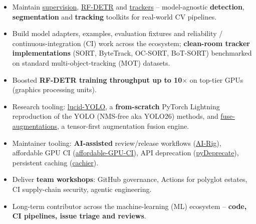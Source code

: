 \documentclass[10pt,a4paper,sans]{moderncv}
\begin{document}
{
	\begin{itemize}
		\item Maintain \href{https://github.com/roboflow/supervision}{supervision}, \href{https://github.com/roboflow/RF-DETR}{RF-DETR} and \href{https://github.com/roboflow/trackers}{trackers} -- model-agnostic \textbf{detection}, \textbf{segmentation} and \textbf{tracking} toolkits for real-world CV pipelines.
		\item Build model adapters, examples, evaluation fixtures and reliability / continuous-integration (CI) work across the ecosystem; \textbf{clean-room tracker implementations} (SORT, ByteTrack, OC-SORT, BoT-SORT) benchmarked on standard multi-object-tracking (MOT) datasets.
		\item Boosted \textbf{RF-DETR training throughput up to 10$\times$} on top-tier GPUs (graphics processing units).
	\end{itemize}
}
{
	\begin{itemize}
		\item Research tooling: \href{https://github.com/Borda/lucid-YOLO}{lucid-YOLO}, a \textbf{from-scratch} PyTorch Lightning reproduction of the YOLO (NMS-free aka YOLO26) methods, and \href{https://github.com/Borda/fuse-augmentations}{fuse-augmentations}, a tensor-first augmentation fusion engine.
		\item Maintainer tooling: \textbf{AI-assisted} review/release workflows (\href{https://github.com/Borda/AI-Rig}{AI-Rig}), affordable GPU CI (\href{https://github.com/Borda/affordable-GPU-CI}{affordable-GPU-CI}), API deprecation (\href{https://github.com/Borda/pyDeprecate}{pyDeprecate}), persistent caching (\href{https://github.com/python-cachier/cachier}{cachier}).
		\item Deliver \textbf{team workshops}: GitHub governance, Actions for polyglot estates, CI supply-chain security, agentic engineering.
		\item Long-term contributor across the machine-learning (ML) ecosystem -- \textbf{code, CI pipelines, issue triage and reviews}.
	\end{itemize}
}
\end{document}
